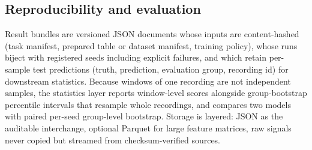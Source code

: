 \subsection{Reproducibility and evaluation}

Result bundles are versioned JSON documents whose inputs are content-hashed
(task manifest, prepared table or dataset manifest, training policy), whose
runs biject with registered seeds including explicit failures, and which
retain per-sample test predictions (truth, prediction, evaluation group,
recording id) for downstream statistics. Because windows of one recording
are not independent samples, the statistics layer reports window-level
scores alongside group-bootstrap percentile intervals that resample whole
recordings, and compares two models with paired per-seed group-level
bootstrap. Storage is layered: JSON as the auditable interchange, optional
Parquet for large feature matrices, raw signals never copied but streamed
from checksum-verified sources.
